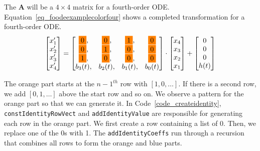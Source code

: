 The $\boldsymbol{A}$ will be a $4 \times 4$ matrix for a fourth-order ODE. Equation~\ref{eq_foodeexamplecolorfour} shows a completed transformation for a fourth-order ODE.
\begin{equation} \label{eq_foodeexamplecolorfour}
	\begin{bmatrix}
		{x_{1}'} \\
    {x_{2}'} \\
    {x_{3}'} \\
    {x_{4}'}
	\end{bmatrix}
    = 
  \begin{bmatrix}
		\highlight{orange}{0}, & \highlight{orange}{0}, & \highlight{orange}{1}, & \highlight{orange}{0} \\
    \highlight{orange}{0}, & \highlight{orange}{1}, & \highlight{orange}{0}, & \highlight{orange}{0} \\
    \highlight{orange}{1}, & \highlight{orange}{0}, & \highlight{orange}{0}, & \highlight{orange}{0} \\
    {b_{3}(t)}, & {b_{2}(t)}, & {b_{1}(t)}, & {b_{0}(t)}
	\end{bmatrix}
    \cdot
  \begin{bmatrix}
		{x_{4}} \\
    {x_{3}} \\
    {x_{2}} \\
    {x_{1}}
	\end{bmatrix}
    + 
  \begin{bmatrix}
    {0} \\
    {0} \\
    {0} \\
    {h(t)}
	\end{bmatrix}
\end{equation}

The orange part starts at the ${n-1}^{th}$ row with $[1, 0, \dots]$. If there is a second row, we add $[0, 1, \dots]$ above the start row and so on. We observe a pattern for the orange part so that we can generate it. In Code~\ref{code_createidentity}, \verb|constIdentityRowVect| and \verb|addIdentityValue| are responsible for generating each row in the orange part. We first create a row containing a list of 0. Then, we replace one of the 0s with 1. The \verb|addIdentityCoeffs| run through a recursion that combines all rows to form the orange and blue parts.

